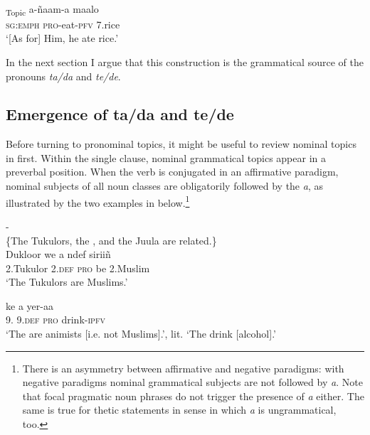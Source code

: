 \documentclass[output=paper
,newtxmath
,modfonts
,nonflat]{langsci/langscibook}
\begin{document}
\ea\label{ex:apel:11}{  \citep[53]{Renaudier2012}} \\
\gll   [ten]\textsubscript{Topic} a-ñaam-a maalo\\
     \textsc{sg:emph} \textsc{pro-}eat\textsc{-pfv} \textsc{7.}rice \\
\glt ‘[As for] Him, he ate rice.’
\z

In the next section I argue that this construction is the grammatical source of the pronouns \textit{ta/da} and \textit{te/de}.

\subsection{Emergence of ta/da and te/de}\label{sec:apel:2.2}

Before turning to pronominal  topics, it might be useful to review nominal  topics in  first. Within the single clause, nominal grammatical  topics appear in a preverbal position. When the verb is conjugated in an affirmative paradigm, nominal subjects of all noun classes are obligatorily followed by the  \textit{a}, as illustrated by the two examples in  below.\footnote{There is an asymmetry between affirmative and negative paradigms: with negative paradigms nominal grammatical subjects are not followed by \textit{a}. Note that focal pragmatic  noun phrases do not trigger the presence of \textit{a} either. The same is true for thetic statements in  sense in which \textit{a} is ungrammatical, too.}

\ea\label{ex:apel:12}{- \citep[289]{Faye1979}}\\
\-\hspace{0.5cm}\{The Tukulors, the , and the Juula are related.\}\\
\ea\label{ex:apel:12a}
\gll Dukloor we a ndef siriiñ\\
     \textsc{2.}Tukulor \textsc{2.def} \textsc{pro} be \textsc{2.}Muslim\\
\glt ‘The Tukulors are Muslims.’

\ex\label{ex:apel:12b}
\gll {} ke a yer-aa\\
     \textsc{9.} \textsc{9.def} \textsc{pro} drink\textsc{-ipfv}\\
\glt ‘The  are animists [i.e. not Muslims].’, lit. ‘The  drink [alcohol].’
\z
\z
\end{document}
